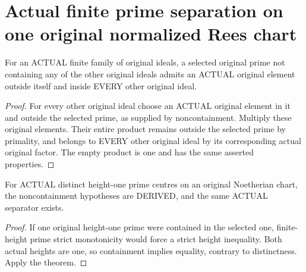 \section{Actual finite prime separation on one original normalized Rees chart}

\begin{theorem}
\label{thm:actual-finite-prime-separator}
For an ACTUAL finite family of original ideals, a selected original prime
not containing any of the other original ideals admits an ACTUAL original
element outside itself and inside EVERY other original ideal.
\leanok
\end{theorem}
\begin{proof}
For every other original ideal choose an ACTUAL original element in it
and outside the selected prime, as supplied by noncontainment. Multiply
these original elements. Their entire product remains outside the selected
prime by primality, and belongs to EVERY other original ideal by its
corresponding actual original factor. The empty product is one and has
the same asserted properties.
\end{proof}

\begin{corollary}
\label{cor:actual-height-one-prime-separator}
For ACTUAL distinct height-one prime centres on an original Noetherian
chart, the noncontainment hypotheses are DERIVED, and the same ACTUAL
separator exists.
\end{corollary}
\begin{proof}
If one original height-one prime were contained in the selected one,
finite-height prime strict monotonicity would force a strict height
inequality. Both actual heights are one, so containment implies equality,
contrary to distinctness. Apply the theorem.
\end{proof}
